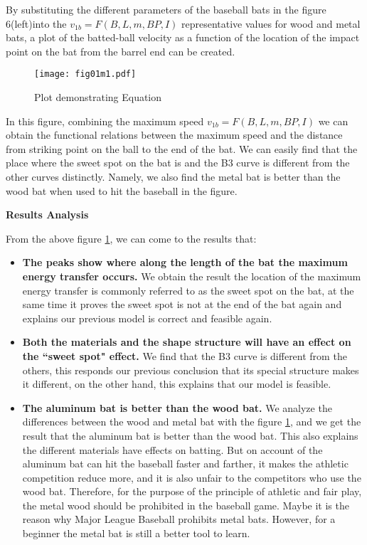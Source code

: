 By substituting the different parameters of the baseball bats in the figure 6(left)into the $v_{1b}=F(B,L,m,BP,I)$ representative values for wood and metal bats, a plot of the batted-ball velocity as a function of the location of the impact point on the bat from the barrel end can be created.


\begin{figure}[!htb]
\centering
\texttt{[image: fig01m1.pdf]}
\caption{\label{Plotdemonstrating}Plot demonstrating Equation}
\end{figure}

In this figure, combining the maximum speed $v_{1b}=F(B,L,m,BP,I)$ we can obtain the functional relations between the maximum speed and the distance from striking point on the ball to the end of the bat. We can easily find that the place where the sweet spot on the bat is and the B3 curve is different from the other curves distinctly. Namely, we also find the metal bat is better than the wood bat when used to hit the baseball in the figure.

\textbf{Results Analysis}

From the above figure \ref{Plotdemonstrating}, we can come to the results that:

\begin{itemize}

\item \textbf{The peaks show where along the length of the bat the maximum energy transfer occurs.} We obtain the result the location of the maximum energy transfer is commonly referred to as the sweet spot on the bat, at the same time it proves the sweet spot is not at the end of the bat again and explains our previous model is correct and feasible again.

\item \textbf{Both the materials and the shape structure will have an effect on the ``sweet spot" effect.}
 We find that the B3 curve is different from the others, this responds our previous conclusion that its special structure makes it different, on the other hand, this explains that our model is feasible.

\item \textbf{The aluminum bat is better than the wood bat.} We analyze the differences between the wood and metal bat with the figure \ref{Plotdemonstrating}, and we get the result that the aluminum bat is better than the wood bat. This also explains the different materials have effects on batting. But on account of the aluminum bat can hit the baseball faster and farther, it makes the athletic competition reduce more, and it is also unfair to the competitors who use the wood bat. Therefore, for the purpose of the principle of athletic and fair play, the metal wood should be prohibited in the baseball game. Maybe it is the reason why Major League Baseball prohibits metal bats. However, for a beginner the metal bat is still a better tool to learn.

\end{itemize}
